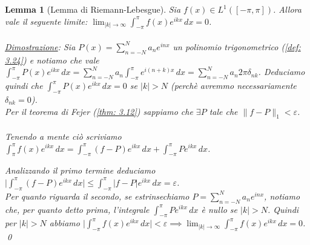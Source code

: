 \documentclass[a4paper,12pt]{report}
\newtheorem{lemma}{Lemma}[chapter]
\newcommand{\lt}{<}
\newcommand{\gt}{>}
\begin{document}
\begin{lemma}[Lemma di Riemann-Lebesgue]
    Sia $f(x)\in L^1([-\pi,\pi])$. Allora vale il seguente limite: $\displaystyle\lim_{|k|\to\infty}\int_{-\pi}^\pi f(x) e^{ikx}\,dx=0$.
    \\
    \\ \underline{Dimostrazione}: Sia $P(x)=\displaystyle\sum_{n=-N}^Na_ne^{inx}$ un polinomio trigonometrico (\ref{def: 3.24}) e notiamo che vale $\displaystyle\int_{-\pi}^\pi P(x) e^{ikx} \,dx=\sum_{n=-N}^Na_n\int_{-\pi}^\pi e^{i(n+k)x}\,dx=\sum_{n=-N}^Na_n2\pi \delta_{nk}$. Deduciamo quindi che $\displaystyle\int_{-\pi}^\pi P(x)e^{ikx}\,dx=0$ se $|k|\gt N$ (perchè avremmo necessariamente $\delta_{nk}=0$).
    \\ Per il teorema di Fejer (\ref{thm: 3.12}) sappiamo che $\exists P$ tale che $\|f-P\|_1\lt \varepsilon$. 
    \\
    \\Tenendo a mente ciò scriviamo $\displaystyle\int_{\pi}^\pi f(x)e^{ikx}\,dx=\int_{-\pi}^\pi (f-P)e^{ikx}\,dx+\int_{-\pi}^\pi P e^{ikx}\,dx$.
    \newpage

     Analizzando il primo termine deduciamo $\bigg|\displaystyle\int_{-\pi}^\pi(f-P)e^{ikx}\,dx\bigg|\leq \int_{-\pi}^\pi |f-P|e^{ikx}\,dx=\varepsilon $.
     \\ Per quanto riguarda il secondo, se estrinsechiamo $P=\displaystyle\sum_{n=-N}^Na_ne^{inx}$, notiamo che, per quanto detto prima, l'integrale $\displaystyle\int_{-\pi}^\pi  Pe^{ikx}\,dx$ è nullo se $|k|\gt N$. Quindi per $|k|\gt N$ abbiamo $\bigg|\displaystyle\int_{-\pi}^\pi f(x)e^{ikx}\,dx\bigg|\lt \varepsilon\implies \lim_{|k|\to\infty}\int_{-\pi}^\pi f(x)e^{ikx}\,dx=0$. \qed
\end{lemma}
\end{document}
